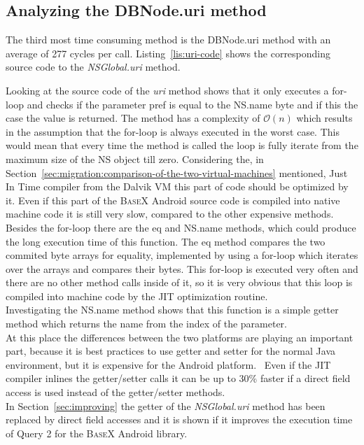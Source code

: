 \subsection*{Analyzing the \textsf{DBNode.uri} method}
\label{sec:analyzing-the-dbnode.uri-method}
The third most time consuming method is the \textsf{DBNode.uri} method with an average of 277 cycles per call.
Listing~\ref{lis:uri-code} shows the corresponding source code to the \textit{NSGlobal.uri} method.
		
Looking at the source code of the \textit{uri} method shows that it only executes a for-loop and checks if the parameter \textsf{pref} is equal to the \textsf{NS.name} byte and if this the case the value is returned.
The method has a complexity of $\mathcal O(n)$ which results in the assumption that the for-loop is always executed in the worst case.
This would mean that every time the method is called the loop is fully iterate from the maximum size of the \textsf{NS} object till zero.
Considering the, in Section~\ref{sec:migration:comparison-of-the-two-virtual-machines} mentioned, Just In Time compiler from the Dalvik VM this part of code should be optimized by it.
Even if this part of the \textsc{BaseX} Android source code is compiled into native machine code it is still very slow, compared to the other expensive methods.
Besides the for-loop there are the \textsf{eq} and \textsf{NS.name} methods, which could produce the long execution time of this function.
The \textsf{eq} method compares the two commited byte arrays for equality, implemented by using a for-loop which iterates over the arrays and compares their bytes.
This for-loop is executed very often and there are no other method calls inside of it, so it is very obvious that this loop is compiled into machine code by the JIT optimization routine.\\
Investigating the \textsf{NS.name} method shows that this function is a simple getter method which returns the name from the index of the parameter.\\
At this place the differences between the two platforms are playing an important part, because it is best practices to use getter and setter for the normal Java environment, but it is expensive for the Android platform.~\cite{toninievlautatingandroid}
Even if the JIT compiler inlines the getter/setter calls it can be up to 30\% faster if a direct field access is used instead of the getter/setter methods.~\cite{toninianalysis}\\
In Section~\ref{sec:improving} the getter of the \textit{NSGlobal.uri} method has been replaced by direct field accesses and it is shown if it improves the execution time of Query 2 for the \textsc{BaseX} Android library.


